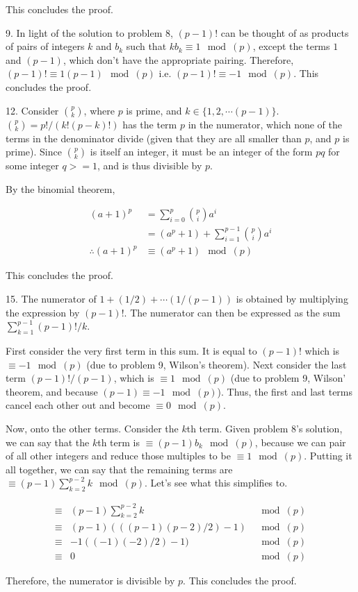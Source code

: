 \documentclass{article}
\begin{document}
This concludes the proof.

9. In light of the solution to problem 8, $(p - 1)!$ can be thought of as products of pairs of integers $k$ and $b_k$ such that $kb_k \equiv 1 \mod(p)$, except the terms $1$ and $(p - 1)$, which don't have the appropriate pairing. Therefore, $(p - 1)! \equiv 1 (p - 1) \mod(p)$ i.e. $(p - 1)! \equiv -1 \mod(p)$. This concludes the proof.

12. Consider $p \choose k$, where $p$ is prime, and $k \in \{1, 2, \cdots (p - 1)\}$. ${p \choose k} = p! / (k! (p - k)!)$ has the term $p$ in the numerator, which none of the terms in the denominator divide (given that they are all smaller than $p$, and $p$ is prime). Since ${p \choose k}$ is itself an integer, it must be an integer of the form $pq$ for some integer $q >= 1$, and is thus divisible by $p$.

By the binomial theorem,

\begin{align*}
               (a + 1)^p &= \sum_{i = 0}^p {p \choose i} a^i \\
                         &= (a^p + 1) + \sum_{i = 1}^{p - 1} {p \choose i} a^i \\
    \therefore (a + 1)^p &\equiv (a^p + 1) \mod(p)
\end{align*}

This concludes the proof.

15. The numerator of $1 + (1 / 2) + \cdots (1 / (p - 1))$ is obtained by multiplying the expression by $(p - 1)!$. The numerator can then be expressed as the sum $\sum_{k = 1}^{p - 1} (p - 1)! / k$.

First consider the very first term in this sum. It is equal to $(p - 1)!$ which is $\equiv -1 \mod(p)$ (due to problem 9, Wilson's theorem). Next consider the last term $(p - 1)! / (p - 1)$, which is $\equiv 1 \mod(p)$ (due to problem 9, Wilson' theorem, and because $(p - 1) \equiv -1 \mod(p)$). Thus, the first and last terms cancel each other out and become $\equiv 0 \mod(p)$.

Now, onto the other terms. Consider the $k$th term. Given problem 8's solution, we can say that the $k$th term is $\equiv (p - 1) b_k \mod(p)$, because we can pair of all other integers and reduce those multiples to be $\equiv 1 \mod(p)$. Putting it all together, we can say that the remaining terms are $\equiv (p - 1) \sum_{k = 2}^{p - 2} k \mod(p)$. Let's see what this simplifies to.

\begin{align*}
    \equiv & (p - 1) \sum_{k = 2}^{p - 2} k & \mod(p) \\ 
    \equiv & (p - 1) (((p - 1)(p - 2) / 2) - 1) & \mod(p) \\ 
    \equiv & -1 ((- 1)(- 2) / 2) - 1) & \mod(p) \\ 
    \equiv & 0 & \mod(p)
\end{align*}

Therefore, the numerator is divisible by $p$. This concludes the proof.
\end{document}

